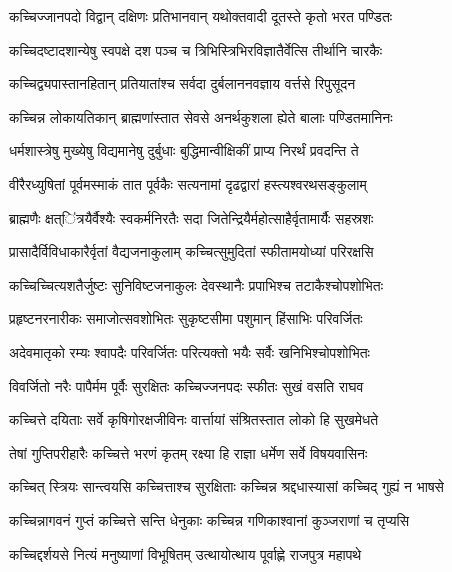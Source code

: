 \twolineshloka
{कच्चिज्जानपदो विद्वान् दक्षिणः प्रतिभानवान्}
{यथोक्तवादी दूतस्ते कृतो भरत पण्डितः} %

\twolineshloka
{कच्चिदष्टादशान्येषु स्वपक्षे दश पञ्च च}
{त्रिभिस्त्रिभिरविज्ञातैर्वेत्सि तीर्थानि चारकैः} %

\twolineshloka
{कच्चिद्व्यपास्तानहितान् प्रतियातांश्च सर्वदा}
{दुर्बलाननवज्ञाय वर्त्तसे रिपुसूदन} %

\twolineshloka
{कच्चिन्न लोकायतिकान् ब्राह्मणांस्तात सेवसे}
{अनर्थकुशला ह्येते बालाः पण्डितमानिनः} %

\twolineshloka
{धर्मशास्त्रेषु मुख्येषु विद्यमानेषु दुर्बुधाः}
{बुद्धिमान्वीक्षिकीं प्राप्य निरर्थं प्रवदन्ति ते} %

\twolineshloka
{वीरैरध्युषितां पूर्वमस्माकं तात पूर्वकैः}
{सत्यनामां दृढद्वारां हस्त्यश्वरथसङ्कुलाम्} %

\twolineshloka
{ब्राह्मणैः क्षत्ऺित्रयैर्वैश्यैः स्वकर्मनिरतैः सदा}
{जितेन्द्रियैर्महोत्साहैर्वृतामार्यैः सहस्रशः} %

\twolineshloka
{प्रासादैर्विविधाकारैर्वृतां वैद्यजनाकुलाम्}
{कच्चित्सुमुदितां स्फीतामयोध्यां परिरक्षसि} %

\twolineshloka
{कच्चिच्चित्यशतैर्जुष्टः सुनिविष्टजनाकुलः}
{देवस्थानैः प्रपाभिश्च तटाकैश्चोपशोभितः} %

\twolineshloka
{प्रहृष्टनरनारीकः समाजोत्सवशोभितः}
{सुकृष्टसीमा पशुमान् हिंसाभिः परिवर्जितः} %

\twolineshloka
{अदेवमातृको रम्यः श्वापदैः परिवर्जितः}
{परित्यक्तो भयैः सर्वैः खनिभिश्चोपशोभितः} %

\twolineshloka
{विवर्जितो नरैः पापैर्मम पूर्वैः सुरक्षितः}
{कच्चिज्जनपदः स्फीतः सुखं वसति राघव} %

\twolineshloka
{कच्चित्ते दयिताः सर्वे कृषिगोरक्षजीविनः}
{वार्त्तायां संश्रितस्तात लोको हि सुखमेधते} %

\twolineshloka
{तेषां गुप्तिपरीहारैः कच्चित्ते भरणं कृतम्}
{रक्ष्या हि राज्ञा धर्मेण सर्वे विषयवासिनः} %

\twolineshloka
{कच्चित् स्त्रियः सान्त्वयसि कच्चित्ताश्च सुरक्षिताः}
{कच्चिन्न श्रद्दधास्यासां कच्चिद् गुह्यं न भाषसे} %

\twolineshloka
{कच्चिन्नागवनं गुप्तं कच्चित्ते सन्ति धेनुकाः}
{कच्चिन्न गणिकाश्वानां कुञ्जराणां च तृप्यसि} %

\twolineshloka
{कच्चिद्दर्शयसे नित्यं मनुष्याणां विभूषितम्}
{उत्थायोत्थाय पूर्वाह्णे राजपुत्र महापथे} %

